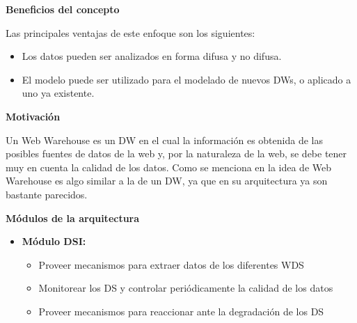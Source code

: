 \documentclass{fancyslides}
\begin{document}
\begin{frame}
\misc
{
\textbf{Beneficios del concepto}
\newline

Las principales ventajas de este enfoque son los siguientes:
\begin{itemize}
  \item Los datos pueden ser analizados en forma difusa y no difusa.
  \item El modelo puede ser utilizado para el modelado de nuevos DWs, o aplicado a uno ya existente.
\end{itemize}
}
\end{frame}


\begin{frame}
\end{frame}

\begin{frame}
\misc
{ \textbf{Motivación}
\newline

\justifying Un Web Warehouse es un DW en el cual la información es obtenida de las posibles fuentes de datos de la web y, por la naturaleza de la web, se debe tener muy en cuenta la calidad de los datos. Como se menciona en \cite{WWPaper} la idea de Web Warehouse es algo similar a la de un DW, ya que en su arquitectura ya son bastante parecidos.

}
\end{frame}



\begin{frame}
\end{frame}


\begin{frame}
\misc
{ \textbf{\Large Módulos de la arquitectura}
\newline
\newline

\begin{itemize}
  \item \textbf{Módulo DSI:} 
    \begin{itemize}
      \item Proveer mecanismos para extraer datos de los diferentes WDS
      \item Monitorear los DS y controlar periódicamente la calidad de los datos
      \item Proveer mecanismos para reaccionar ante la degradación de los DS
    \end{itemize}
\end{itemize}

}
\end{frame}
\end{document}

